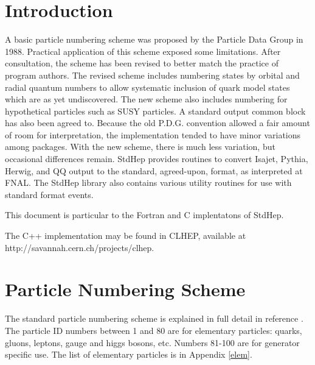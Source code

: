 
\section {  Introduction }

A basic particle numbering scheme was proposed by the Particle Data
Group in 1988\cite{pdg88}.
Practical application of this scheme exposed some limitations.
After consultation\cite{knowles}, the scheme has been revised to
better match the practice of program authors.  The revised scheme
includes numbering states by orbital and radial quantum numbers
to allow systematic inclusion of quark model states which are
as yet undiscovered.  The new scheme also includes numbering for
hypothetical particles such as SUSY particles.
A standard output common block \cite{hepevt} has also been agreed to.
Because the old P.D.G. convention allowed a fair amount of room for
interpretation,
the implementation tended to have minor variations among packages.
With the new scheme, there is much less variation, but occasional differences
remain.  StdHep provides routines to convert
Isajet, Pythia, Herwig, and QQ output to the standard, agreed-upon, format,
as interpreted at FNAL.  The StdHep library also contains various utility
routines for use with standard format events.

This document is particular to the Fortran and C implentatons of StdHep.

The C++ implementation may be found in CLHEP\cite{clhep},
available at http://savannah.cern.ch/projects/clhep.

\section { Particle Numbering Scheme }

The standard particle numbering scheme is explained in full detail in
reference \cite{newscheme}.
The particle ID numbers between 1 and 80 are for elementary particles:
quarks, gluons, leptons, gauge and higgs bosons, etc.
Numbers 81-100 are for generator specific use.
The list of elementary particles is in Appendix \ref{elem}.

